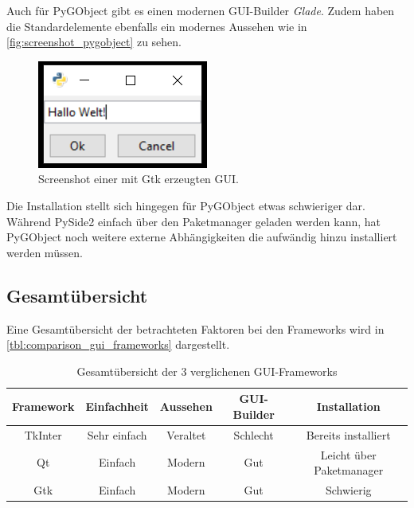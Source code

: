 Auch für PyGObject gibt es einen modernen \ac{GUI}-Builder \textit{Glade}. Zudem haben die Standardelemente ebenfalls ein modernes Aussehen wie in \autoref{fig:screenshot_pygobject} zu sehen.

\begin{figure}[h]
\begin{center}
\includegraphics[scale=0.7]{images/pygobject_screenshot.png}
\caption{Screenshot einer mit Gtk erzeugten GUI.}
\label{fig:screenshot_pygobject}
\end{center}
\end{figure}

Die Installation stellt sich hingegen für PyGObject etwas schwieriger dar. Während PySide2 einfach über den Paketmanager geladen werden kann, hat PyGObject noch weitere externe Abhängigkeiten die aufwändig hinzu installiert werden müssen.

\subsection{Gesamtübersicht}
Eine Gesamtübersicht der betrachteten Faktoren bei den Frameworks wird in \autoref{tbl:comparison_gui_frameworks} dargestellt.
\begin{table}[h]
\begin{center}
\begin{tabular}{c|c|c|c|c}
Framework & Einfachheit & Aussehen & GUI-Builder & Installation \\
\hline
TkInter & {\cellcolor{green!50}}Sehr einfach & \cellcolor{red!50}Veraltet & \cellcolor{red!50}Schlecht & \cellcolor{green!50}Bereits installiert \\
Qt & \cellcolor{green!25}Einfach & \cellcolor{green!50}Modern & \cellcolor{green!50}Gut & \cellcolor{green!25}Leicht über Paketmanager \\
Gtk & \cellcolor{green!25}Einfach & \cellcolor{green!50}Modern & \cellcolor{green!50}Gut & \cellcolor{red!50}Schwierig
\end{tabular}
\end{center}
\caption{\label{tbl:comparison_gui_frameworks}Gesamtübersicht der 3 verglichenen GUI-Frameworks}
\end{table}

